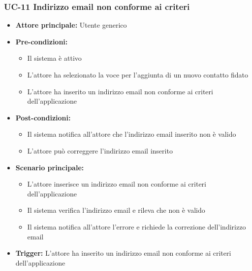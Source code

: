\documentclass[a4paper,12pt]{article}
\begin{document}
\subsubsection{UC-11 Indirizzo email non conforme ai criteri} \label{subsec:UC-11}
\begin{itemize}
    \item \textbf{Attore principale:} Utente generico
    \item \textbf{Pre-condizioni:}
    \begin{itemize}
        \item Il sistema è attivo
        \item L'attore ha selezionato la voce per l'aggiunta di un nuovo contatto fidato
        \item L'attore ha inserito un indirizzo email non conforme ai criteri dell'applicazione
    \end{itemize}
    \item \textbf{Post-condizioni:} 
    \begin{itemize}
        \item Il sistema notifica all'attore che l'indirizzo email inserito non è valido
        \item L'attore può correggere l'indirizzo email inserito
    \end{itemize}
    \item \textbf{Scenario principale:} 
    \begin{itemize}        
        \item L'attore inserisce un indirizzo email non conforme ai criteri dell'applicazione
        \item Il sistema verifica l'indirizzo email e rileva che non è valido
        \item Il sistema notifica all'attore l'errore e richiede la correzione dell'indirizzo email
    \end{itemize}
    \item \textbf{Trigger:} L'attore ha inserito un indirizzo email non conforme ai criteri dell'applicazione
\end{itemize}

\end{document}
